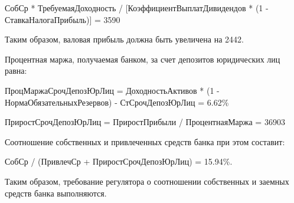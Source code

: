 \documentclass[12pt, table]{exam}
\begin{document}
\begin{questions}
\begin{subparts}
\begin{solution}[6em]
		СобСр * ТребуемаяДоходность / [КоэффициентВыплатДивидендов * (1 - СтавкаНалогаПрибыль)] = 3590
		
		Таким образом, валовая прибыль должна быть увеличена на 2442. 
		
		Процентная маржа, получаемая банком, за счет депозитов юридических лиц равна:
		
		ПроцМаржаСрочДепозЮрЛиц = ДоходностьАктивов * (1 - НормаОбязательныхРезервов) -
		СтСрочДепозЮрЛиц = 6.62\%
		
		ПриростСрочДепозЮрЛиц =  ПриростПрибыли / ПроцентнаяМаржа = 36903
				
		Соотношение собственных и привлеченных средств банка при этом составит:
		
		СобСр / (ПривлечСр + ПриростСрочДепозЮрЛиц) = 15.94\%.
		
		Таким образом, требование регулятора о соотношении собственных и заемных средств банка выполняются. 		
	\end{solution}
\end{subparts}
\addpoints

\end{questions}
\end{document}
